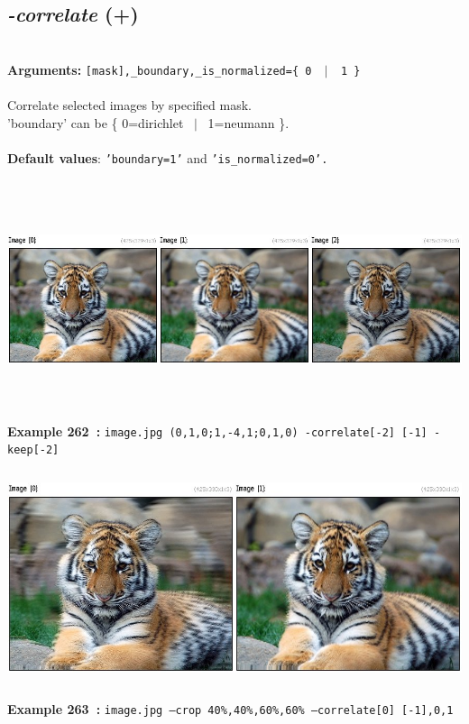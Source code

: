 \documentclass[a4paper,11pt,twoside]{book}
\begin{document}
\subsection{\emph{-correlate} (+)}\vspace*{-0.5em}
~\\\textbf{Arguments: } 
{\small \texttt{[mask],\_boundary,\_is\_normalized=\{ 0 ~$|$~ 1 \}}}\\~\\
Correlate selected images by specified mask.
~\\'boundary' can be \{ 0=dirichlet ~$|$~ 1=neumann \}.
~\\~\\\textbf{Default values}: {\small \texttt{'boundary=1'} and \texttt{'is\_normalized=0'.}}
\begin{center}\includegraphics[keepaspectratio=true,height=7cm,width=\textwidth]{img/gmic_def262.jpg}\\
{\footnotesize \textbf{Example 262~:} \texttt{image.jpg (0,1,0;1,-4,1;0,1,0) -correlate[-2] [-1] -keep[-2]}}
\\\includegraphics[keepaspectratio=true,height=7cm,width=\textwidth]{img/gmic_def263.jpg}\\
{\footnotesize \textbf{Example 263~:} \texttt{image.jpg --crop 40\%,40\%,60\%,60\% --correlate[0] [-1],0,1}}
\end{center}
\end{document}
